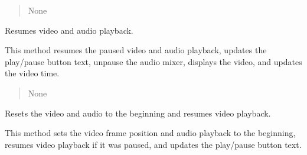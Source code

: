 \documentclass[letterpaper,10pt,english]{sphinxmanual}
\begin{document}
\begin{fulllineitems}
\begin{fulllineitems}
\begin{quote}
\begin{description}
\sphinxAtStartPar
None

\sphinxAtStartPar
{} \textendash{} 

\end{description}\end{quote}

\end{fulllineitems}


\begin{fulllineitems}
\label{\detokenize{general_interface:general_interface.LecteurVideo.resume_lecture}}
\pysigstartsignatures
{}
\pysigstopsignatures
\sphinxAtStartPar
Resumes video and audio playback.

\sphinxAtStartPar
This method resumes the paused video and audio playback, updates the play/pause button text,
unpause the audio mixer, displays the video, and updates the video time.
\begin{quote}\begin{description}
\sphinxAtStartPar
{} \textendash{} 

\sphinxAtStartPar
None

\sphinxAtStartPar
{} \textendash{} 

\end{description}\end{quote}

\end{fulllineitems}


\begin{fulllineitems}
\label{\detokenize{general_interface:general_interface.LecteurVideo.revoir_video}}
\pysigstartsignatures
{}
\pysigstopsignatures
\sphinxAtStartPar
Resets the video and audio to the beginning and resumes video playback.

\sphinxAtStartPar
This method sets the video frame position and audio playback to the beginning,
resumes video playback if it was paused, and updates the play/pause button text.
\begin{quote}\begin{description}
\sphinxAtStartPar
{} \textendash{} 


\end{description}
\end{quote}
\end{fulllineitems}
\end{fulllineitems}
\end{document}
